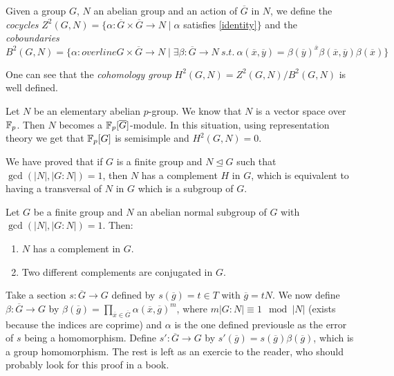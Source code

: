 \documentclass[twoside, 11pt]{article}
\begin{document}
Given a group $G$, $N$ an abelian group and an action of $\overline{G}$ in $N$, we define the \emph{cocycles} $Z^2(G,N)=\{\alpha:\overline{G}\times\overline{G}\to N\mid \alpha$ satisfies \ref{identity}$\}$ and the \emph{coboundaries} $B^2(G,N)=\{\alpha:overline{G}\times\overline{G}\to N\mid\exists\beta:\overline{G}\to N\ s.t.\ \alpha(\overline{x},\overline{y})=\beta(\overline{y})^{\overline{x}}\beta(\overline{x},\overline{y})\beta(\overline{x})\}$

One can see that the \emph{cohomology group} $H^2(G,N)=Z^2(G,N)/B^2(G,N)$ is well defined. 

Let $N$ be an elementary abelian $p$-group. We know that $N$ is a vector space over $\mathbb{F}_p$. Then $N$ becomes a $\mathbb{F}_p[\overline{G}]$-module. In this situation, using representation theory we get that $\mathbb{F}_p[G]$ is semisimple and $H^2(G,N)=0$. 

We have proved that if $G$ is a finite group and $N\trianglelefteq G$ such that $\gcd(|N|,|G:N|)=1$, then $N$ has a complement $H$ in $G$, which is equivalent to having a transversal of $N$ in $G$ which is a subgroup of $G$. 

\begin{teorema}
Let $G$ be a finite group and $N$ an abelian normal subgroup of $G$ with $\gcd(|N|,|G:N|)=1$. Then:
\begin{enumerate}
\item $N$ has a complement in $G$.
\item Two different complements are conjugated in $G$.
\end{enumerate}
\end{teorema}
\begin{dem}
Take a section $s:\overline{G}\to G$ defined by $s(\overline{g})=t\in T$ with $\overline{g}=tN$. We now define $\beta:\overline{G}\to G$ by $\beta(\overline{g})=\prod_{\overline{x}\in \overline{G}}\alpha(\overline{x},\overline{g})^m$, where $m|G:N|\equiv 1\mod |N|$ (exists because the indices are coprime) and $\alpha$ is the one defined previousle as the error of $s$ being a homomorphism. Define $s':\overline{G}\to G$ by $s'(\overline{g})=s(\overline{g})\beta(\overline{g})$, which is a group homomorphism. The rest is left as an exercie to the reader, who should probably look for this proof in a book.
\end{dem}
\end{document}

